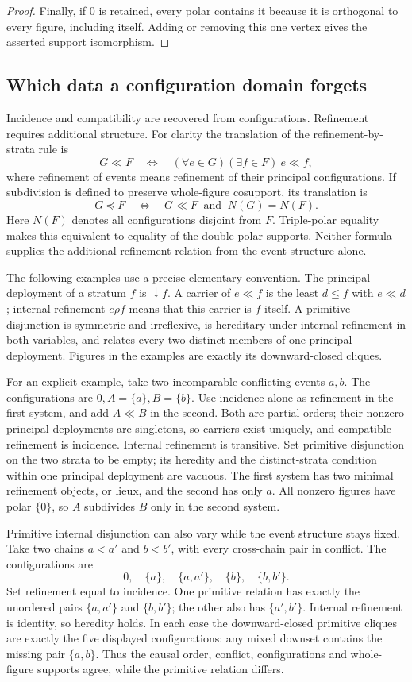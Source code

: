 \begin{proof}
Finally, if $0$ is retained, every polar contains it because it
is orthogonal to every figure, including itself. Adding or removing
this one vertex gives the asserted support isomorphism.
\end{proof}

\subsection{Which data a configuration domain forgets}
Incidence and compatibility are recovered from configurations.
Refinement requires additional structure. For clarity the
translation of the refinement-by-strata rule is
\[
 G\ll F\quad\Longleftrightarrow\quad
 (\forall e\in G)(\exists f\in F)\ e\ll f,
\]
where refinement of events means refinement of their principal
configurations. If subdivision is defined to preserve whole-figure
cosupport, its translation is
\[
 G\preceq F\quad\Longleftrightarrow\quad
 G\ll F\ \text{ and }\ N(G)=N(F).
\]
Here $N(F)$ denotes all configurations disjoint from $F$.
Triple-polar equality makes this equivalent to equality of the
double-polar supports. Neither formula supplies the additional
refinement relation from the event structure alone.

The following examples use a precise elementary convention. The
principal deployment of a stratum $f$ is $\downarrow f$. A carrier
of $e\ll f$ is the least $d\leq f$ with $e\ll d$; internal
refinement $e\rho f$ means that this carrier is $f$ itself.
A primitive disjunction is symmetric and irreflexive, is hereditary
under internal refinement in both variables, and relates every
two distinct members of one principal deployment. Figures in the
examples are exactly its downward-closed cliques.

For an explicit example, take two incomparable conflicting events
$a,b$. The configurations are $0,A=\{a\},B=\{b\}$.
Use incidence alone as refinement in the first system, and add
$A\ll B$ in the second. Both are partial orders; their nonzero
principal deployments are singletons, so carriers exist uniquely,
and compatible refinement is incidence. Internal refinement is
transitive. Set primitive disjunction on the two strata to be empty;
its heredity and the distinct-strata condition within one principal
deployment are vacuous. The first system has two minimal refinement
objects, or lieux, and the second has only $a$. All nonzero figures
have polar $\{0\}$, so $A$ subdivides $B$ only in the second system.

Primitive internal disjunction can also vary while the event
structure stays fixed. Take two chains $a<a'$ and $b<b'$, with
every cross-chain pair in conflict. The configurations are
\[
 0,\quad\{a\},\quad\{a,a'\},\quad\{b\},\quad\{b,b'\}.
\]
Set refinement equal to incidence. One primitive relation has
exactly the unordered pairs $\{a,a'\}$ and $\{b,b'\}$; the other
also has $\{a',b'\}$. Internal refinement is identity, so heredity
holds. In each case the downward-closed primitive cliques are
exactly the five displayed configurations: any mixed downset
contains the missing pair $\{a,b\}$. Thus the causal order,
conflict, configurations and whole-figure supports agree, while
the primitive relation differs.

